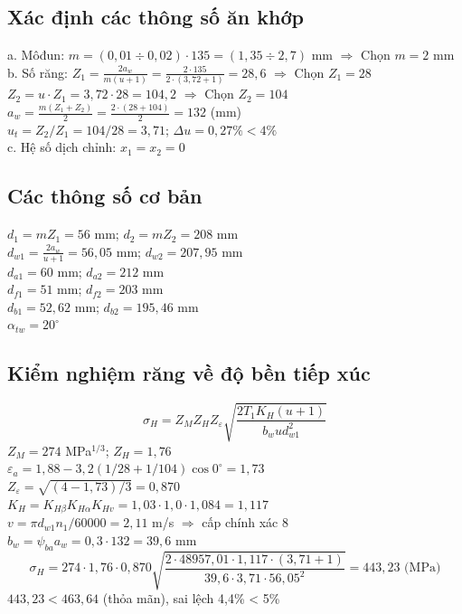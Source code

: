 \documentclass[12pt,a4paper]{report}
\begin{document}
\subsection{Xác định các thông số ăn khớp}
a. Môđun: $m = (0{,}01 \div 0{,}02) \cdot 135 = (1{,}35 \div 2{,}7)$ mm $\Rightarrow$ Chọn $m = 2$ mm\\
b. Số răng: $Z_1 = \frac{2a_w}{m(u+1)} = \frac{2 \cdot 135}{2 \cdot (3{,}72+1)} = 28{,}6$ $\Rightarrow$ Chọn $Z_1 = 28$\\
$Z_2 = u \cdot Z_1 = 3{,}72 \cdot 28 = 104{,}2$ $\Rightarrow$ Chọn $Z_2 = 104$\\
$a_w = \frac{m(Z_1+Z_2)}{2} = \frac{2 \cdot (28+104)}{2} = 132$ (mm)\\
$u_t = Z_2/Z_1 = 104/28 = 3{,}71$; $\Delta u = 0{,}27\% < 4\%$\\
c. Hệ số dịch chỉnh: $x_1 = x_2 = 0$

\subsection{Các thông số cơ bản}
$d_1 = mZ_1 = 56$ mm; $d_2 = mZ_2 = 208$ mm\\
$d_{w1} = \frac{2a_w}{u+1} = 56{,}05$ mm; $d_{w2} = 207{,}95$ mm\\
$d_{a1} = 60$ mm; $d_{a2} = 212$ mm\\
$d_{f1} = 51$ mm; $d_{f2} = 203$ mm\\
$d_{b1} = 52{,}62$ mm; $d_{b2} = 195{,}46$ mm\\
$\alpha_{tw} = 20^\circ$

\subsection{Kiểm nghiệm răng về độ bền tiếp xúc}
$$\sigma_H = Z_M Z_H Z_\varepsilon \sqrt{\frac{2T_1 K_H(u+1)}{b_w u d_{w1}^2}}$$
$Z_M = 274$ MPa$^{1/3}$; $Z_H = 1{,}76$\\
$\varepsilon_a = 1{,}88 - 3{,}2(1/28 + 1/104) \cos 0^\circ = 1{,}73$\\
$Z_\varepsilon = \sqrt{(4-1{,}73)/3} = 0{,}870$\\
$K_H = K_{H\beta} K_{H\alpha} K_{Hv} = 1{,}03 \cdot 1{,}0 \cdot 1{,}084 = 1{,}117$\\
$v = \pi d_{w1} n_1/60000 = 2{,}11$ m/s $\Rightarrow$ cấp chính xác 8\\
$b_w = \psi_{ba} a_w = 0{,}3 \cdot 132 = 39{,}6$ mm
$$\sigma_H = 274 \cdot 1{,}76 \cdot 0{,}870 \sqrt{\frac{2 \cdot 48957{,}01 \cdot 1{,}117 \cdot (3{,}71+1)}{39{,}6 \cdot 3{,}71 \cdot 56{,}05^2}} = 443{,}23 \text{ (MPa)}$$
$443{,}23 < 463{,}64$ (thỏa mãn), sai lệch 4,4\% < 5\%
\end{document}
